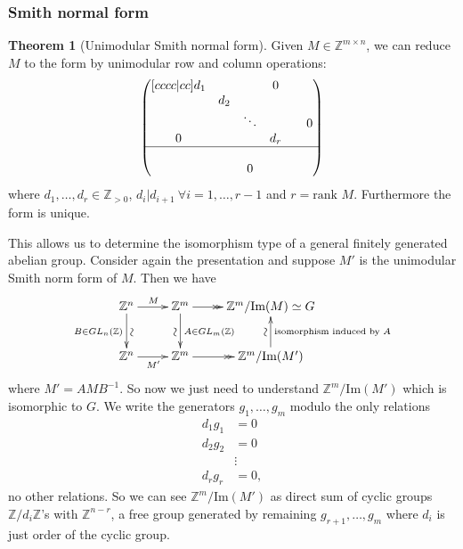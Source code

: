 \documentclass[a4paper]{article}
\newcommand{\rank}{\text{rank }}
\theoremstyle{definition}
\newtheorem{thm}[defn]{Theorem}
\begin{document}
\subsubsection{Smith normal form}
\begin{thm}[Unimodular Smith normal form]
Given $M\in \mathbb Z^{m\times n}$, we can reduce $M$ to the form by unimodular row and column operations:
\[
\begin{pmatrix}[cccc|cc]
d_1 & & & 0 & \\
& d_2 &&& \\
& & \ddots & & & 0 \\
0 & & & d_r \\ \hline &&&&&\\
& & 0 & & &
\end{pmatrix}
\]
where $d_1,\ldots,d_r\in \mathbb Z_{>0}$, $d_i | d_{i+1} \ \forall i=1,\ldots,r-1$ and $r=\rank M$. Furthermore the form is unique.
\end{thm}
This allows us to determine the isomorphism type of a general finitely generated abelian group. Consider again the presentation and suppose $M'$ is the unimodular Smith norm form of $M$. Then we have
\[
\xymatrix{
\mathbb Z^n \ar[r]^{M} \ar[d]_{B\in GL_n(\mathbb Z)}^{\rotatebox{90}{$\sim$}} & \mathbb Z^m\ar@{-{>>}}[r] \ar[d]^{A\in GL_m(\mathbb Z)}_{\rotatebox{-90}{$\sim$}} & {\mathbb Z^m / \text{Im}( M)} \simeq G \\
\mathbb Z^n\ar[r]_{M'} & \mathbb Z^m \ar@{-{>>}}[r] & \mathbb Z^m/\text{Im}(M') \ar[u]^{\rotatebox{-90}{$\sim$}}_{\text{isomorphism induced by }A}
}
\]
where $M'=AMB^{-1}$. So now we just need to understand $\mathbb Z^m/\text{Im}(M')$ which is isomorphic to $G$. We write the generators $g_1,\ldots,g_m$ modulo the only relations
\[
\begin{aligned}
    d_1 g_1&=0 \\
    d_2 g_2&=0 \\
    &\vdots \\
    d_r g_r&=0,
\end{aligned}
\]
no other relations. So we can see $\mathbb Z^m / \text{Im}(M')$ as direct sum of cyclic groups $\mathbb Z/d_i \mathbb Z$'s with $\mathbb Z^{n-r}$, a free group generated by remaining $g_{r+1},\ldots,g_m$ where $d_i$ is just order of the cyclic group.
\end{document}
